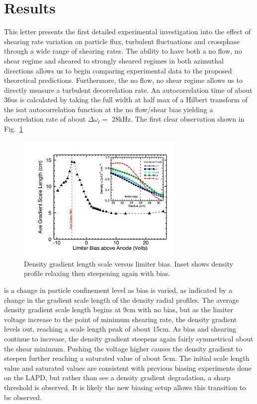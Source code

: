 \documentclass[%
 aip,
 amsmath,amssymb,
 preprint,%
]{revtex4-1}
\begin{document}
\section{Results}
This letter presents the first detailed experimental investigation into the effect of shearing rate variation on particle flux, turbulent fluctuations and crossphase through a wide range of shearing rates. The ability to have both a no flow, no shear regime and sheared to strongly sheared regimes in both azimuthal directions allows us to begin comparing experimental data to the proposed theoretical predictions. Furthermore, the no flow, no shear regime allows us to directly measure a turbulent decorrelation rate. An autocorrelation time of about 36us is calculated by taking the full width at half max of a Hilbert transform of the isat autocorrelation function at the no flow/shear bias yielding a decorrelation rate of about $\Delta \omega_{t} = $ 28kHz.
The first clear observation shown in
Fig.~\ref{fig:densgrad}
\begin{figure}
\begin{center}
\includegraphics[width=8cm]{densgrad.png}%
\end{center}
\caption{\label{fig:densgrad} Density gradient length scale versus limiter bias. Inset shows density profile relaxing then steepening again with bias.}
\end{figure}
is a change in particle confinement level as bias is varied, as indicated by a change in the gradient scale length of the density radial profiles. The average density gradient scale length begins at 9cm with no bias, but as the limiter voltage increase to the point of minimum shearing rate, the density gradient levels out, reaching a scale length peak of about 15cm. As bias and shearing continue to increase, the density gradient steepens again fairly symmetrical about the shear minimum. Pushing the voltage higher causes the density gradient to steepen further reaching a saturated value of about 5cm. The initial scale length value and saturated values are consistent with previous biasing experiments done on the LAPD, but rather than see a density gradient degradation, a sharp threshold is observed. It is likely the new biasing setup allows this transition to be observed.
\end{document}
